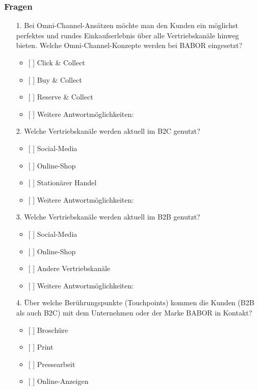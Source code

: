 \subsubsection*{Fragen}
\begin{enumerate}
 \item[1.] Bei Omni-Channel-Ansätzen möchte man den Kunden ein möglichst perfektes und rundes Einkaufserlebnis über alle Vertriebskanäle hinweg bieten. Welche Omni-Channel-Konzepte werden bei BABOR eingesetzt?
     \begin{itemize}
            \item{[ ] Click \& Collect}
            \item{[ ] Buy \& Collect}
            \item{[ ] Reserve \& Collect}
            \item{[ ] Weitere Antwortmöglichkeiten:  }
          \end{itemize}
 \item[2.] Welche Vertriebskanäle werden aktuell im B2C genutzt?
     \begin{itemize}
             \item{[ ] Social-Media}
             \item{[ ] Online-Shop}
             \item{[ ] Stationärer Handel}
             \item{[ ] Weitere Antwortmöglichkeiten:  }
           \end{itemize}
 \item[3.] Welche Vertriebskanäle werden aktuell im B2B genutzt?
    \begin{itemize}
              \item{[ ] Social-Media}
              \item{[ ] Online-Shop}
              \item{[ ] Andere Vertriebskanäle}
              \item{[ ] Weitere Antwortmöglichkeiten:  }
            \end{itemize}
 \item[4.] Über welche Berührungspunkte (Touchpoints) kommen die Kunden (B2B als auch B2C) mit dem Unternehmen oder der Marke BABOR in Kontakt?
    \begin{itemize}
               \item{[ ] Broschüre}
               \item{[ ] Print}
               \item{[ ] Pressearbeit}
               \item{[ ] Online-Anzeigen}

\end{itemize}
\end{enumerate}
